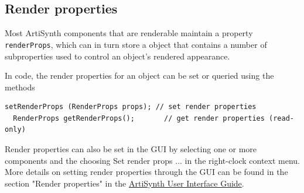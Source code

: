 





\subsection{Render properties}
\label{RenderProperties:sec}

Most ArtiSynth components that are renderable maintain a property {\tt
renderProps}, which can in turn store a
 object that contains a number
of subproperties used to control an object's rendered appearance.

In code, the render properties for an object can be set or queried
using the methods
%
\begin{lstlisting}[]
  setRenderProps (RenderProps props); // set render properties
  RenderProps getRenderProps();       // get render properties (read-only)
\end{lstlisting}
%
Render properties can also be set in the GUI by selecting one or more
components and the choosing {\sf Set render props ...}  in the
right-clock context menu. More details on setting render properties
through the GUI can be found in the section "Render properties" in the
\href{../uiguide/uiguide.html}{
ArtiSynth User Interface Guide}.

